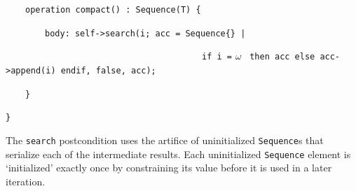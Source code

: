\documentclass[
]{ceurart}
\begin{document}
\begin{description}[itemsep=-0.2cm]\vspace{-10pt}\small\begin{samepage}
\item ~~~~\verb!operation compact() : Sequence(T) {!
\item ~~~~~~~~\verb!body: self->search(i; acc = Sequence{} |!
\item ~~~~~~~~~~~~~~~~~~~~~~~~~~~~~~~~~~~~~~~~\verb!if i =! $\omega$ \verb! then acc else acc->append(i) endif, false, acc);!
\item ~~~~\verb!}!
\item \verb!}!
\end{samepage}\vspace{-10pt}\end{description}

The \verb!search! postcondition uses the artifice of uninitialized \verb!Sequence!s that serialize each of the intermediate results. Each uninitialized \verb!Sequence! element is `initialized' exactly once by constraining its value before it is used in a later iteration.
\end{document}
